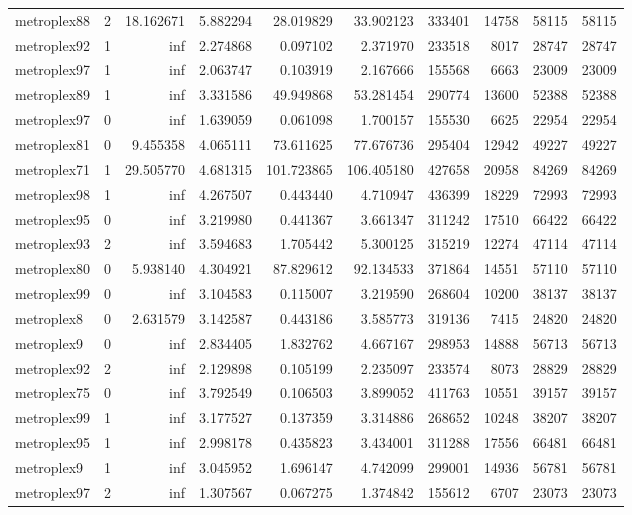 \begin{longtable}{|l|r|r|r|r|r|r|r|r|r|}
metroplex88 & 2 & 18.162671 & 5.882294 & 28.019829 & 33.902123 & 333401 & 14758 & 58115 & 58115 \\
metroplex92 & 1 & inf & 2.274868 & 0.097102 & 2.371970 & 233518 & 8017 & 28747 & 28747 \\
metroplex97 & 1 & inf & 2.063747 & 0.103919 & 2.167666 & 155568 & 6663 & 23009 & 23009 \\
metroplex89 & 1 & inf & 3.331586 & 49.949868 & 53.281454 & 290774 & 13600 & 52388 & 52388 \\
metroplex97 & 0 & inf & 1.639059 & 0.061098 & 1.700157 & 155530 & 6625 & 22954 & 22954 \\
metroplex81 & 0 & 9.455358 & 4.065111 & 73.611625 & 77.676736 & 295404 & 12942 & 49227 & 49227 \\
metroplex71 & 1 & 29.505770 & 4.681315 & 101.723865 & 106.405180 & 427658 & 20958 & 84269 & 84269 \\
metroplex98 & 1 & inf & 4.267507 & 0.443440 & 4.710947 & 436399 & 18229 & 72993 & 72993 \\
metroplex95 & 0 & inf & 3.219980 & 0.441367 & 3.661347 & 311242 & 17510 & 66422 & 66422 \\
metroplex93 & 2 & inf & 3.594683 & 1.705442 & 5.300125 & 315219 & 12274 & 47114 & 47114 \\
metroplex80 & 0 & 5.938140 & 4.304921 & 87.829612 & 92.134533 & 371864 & 14551 & 57110 & 57110 \\
metroplex99 & 0 & inf & 3.104583 & 0.115007 & 3.219590 & 268604 & 10200 & 38137 & 38137 \\
metroplex8 & 0 & 2.631579 & 3.142587 & 0.443186 & 3.585773 & 319136 & 7415 & 24820 & 24820 \\
metroplex9 & 0 & inf & 2.834405 & 1.832762 & 4.667167 & 298953 & 14888 & 56713 & 56713 \\
metroplex92 & 2 & inf & 2.129898 & 0.105199 & 2.235097 & 233574 & 8073 & 28829 & 28829 \\
metroplex75 & 0 & inf & 3.792549 & 0.106503 & 3.899052 & 411763 & 10551 & 39157 & 39157 \\
metroplex99 & 1 & inf & 3.177527 & 0.137359 & 3.314886 & 268652 & 10248 & 38207 & 38207 \\
metroplex95 & 1 & inf & 2.998178 & 0.435823 & 3.434001 & 311288 & 17556 & 66481 & 66481 \\
metroplex9 & 1 & inf & 3.045952 & 1.696147 & 4.742099 & 299001 & 14936 & 56781 & 56781 \\
metroplex97 & 2 & inf & 1.307567 & 0.067275 & 1.374842 & 155612 & 6707 & 23073 & 23073 \\

\end{longtable}
